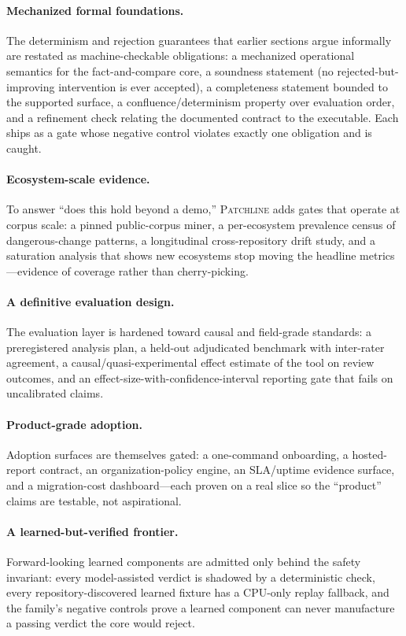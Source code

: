 \documentclass[11pt]{article}
\newcommand{\tool}{\textsc{Patchline}}
\begin{document}
\paragraph{Mechanized formal foundations.}
The determinism and rejection guarantees that earlier sections argue informally are restated as
machine-checkable obligations: a mechanized operational semantics for the fact-and-compare core, a
soundness statement (no rejected-but-improving intervention is ever accepted), a completeness
statement bounded to the supported surface, a confluence/determinism property over evaluation order,
and a refinement check relating the documented contract to the executable. Each ships as a gate whose
negative control violates exactly one obligation and is caught.

\paragraph{Ecosystem-scale evidence.}
To answer ``does this hold beyond a demo,'' \tool{} adds gates that operate at corpus scale: a
pinned public-corpus miner, a per-ecosystem prevalence census of dangerous-change patterns, a
longitudinal cross-repository drift study, and a saturation analysis that shows new ecosystems stop
moving the headline metrics---evidence of coverage rather than cherry-picking.

\paragraph{A definitive evaluation design.}
The evaluation layer is hardened toward causal and field-grade standards: a preregistered analysis
plan, a held-out adjudicated benchmark with inter-rater agreement, a causal/quasi-experimental effect
estimate of the tool on review outcomes, and an effect-size-with-confidence-interval reporting gate
that fails on uncalibrated claims.

\paragraph{Product-grade adoption.}
Adoption surfaces are themselves gated: a one-command onboarding, a hosted-report contract, an
organization-policy engine, an SLA/uptime evidence surface, and a migration-cost dashboard---each
proven on a real slice so the ``product'' claims are testable, not aspirational.

\paragraph{A learned-but-verified frontier.}
Forward-looking learned components are admitted only behind the safety invariant: every model-assisted
verdict is shadowed by a deterministic check, every repository-discovered learned fixture has a
CPU-only replay fallback, and the family's negative controls prove a learned component can never
manufacture a passing verdict the core would reject.
\end{document}
